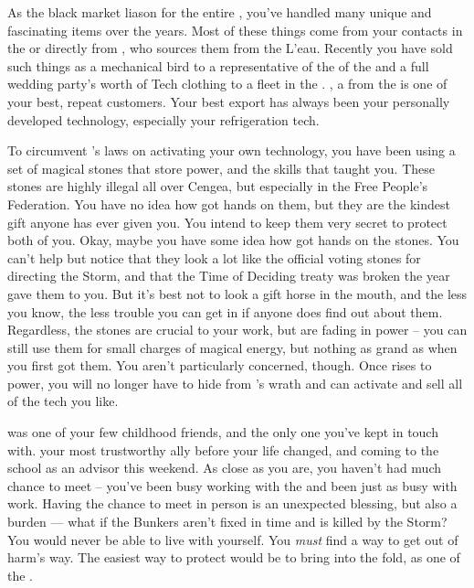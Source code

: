 \documentclass[char]{GL2020}
\begin{document}
As the black market liason for the entire \pTech{}, you've handled many unique and fascinating items over the years. Most of these things come from your contacts in the \pTech{} or directly from \cChupSecond{}, who sources them from the L'eau. Recently you have sold such things as a mechanical bird to a representative of the \cQueen{\Majesty} of the \pFarm{} and a full wedding party's worth of Tech clothing to a fleet in the \pShip{}. \cHedonist{\full}, a \cHedonist{\cleric} from the \pFarm{} is one of your best, repeat customers. Your best export has always been your personally developed technology, especially your refrigeration tech. 

To circumvent \cTechGod{}'s laws on activating your own technology, you have been using a set of magical stones that store power, and the skills that \cGenesis{} taught you. These stones are highly illegal all over Cengea, but especially in the Free People's Federation. You have no idea how \cHeadScientist{} got \cHeadScientist{\their} hands on them, but they are the kindest gift anyone has ever given you. You intend to keep them very secret to protect both of you. Okay, maybe you have some idea how \cHeadScientist{} got \cHeadScientist{\their} hands on the stones. You can't help but notice that they look a lot like the official voting stones for directing the Storm, and that the Time of Deciding treaty was broken the year \cHeadScientist{} gave them to you. But it's best not to look a gift horse in the mouth, and the less you know, the less trouble you can get in if anyone does find out about them. Regardless, the stones are crucial to your work, but are fading in power – you can still use them for small charges of magical energy, but nothing as grand as when you first got them. You aren't particularly concerned, though. Once \cGenesis{} rises to power, you will no longer have to hide from \cTechGod{}'s wrath and can activate and sell all of the tech you like.

\cHeadScientist{} was one of your few childhood friends, and the only one you've kept in touch with. \cHeadScientist{\They} \cHeadScientist{\were} your most trustworthy ally before your life changed, and \cHeadScientist{\theyare} coming to the school as an advisor this weekend. As close as you are, you haven't had much chance to meet -- you've been busy working with the \pGoaties{} and \cHeadScientist{\they} \cHeadScientist{\have} been just as busy with \cHeadScientist{\their} work. Having the chance to meet in person is an unexpected blessing, but also a burden — what if the Bunkers aren't fixed in time and \cHeadScientist{} is killed by the Storm? You would never be able to live with yourself. You \emph{must} find a way to get \cHeadScientist{} out of harm's way. The easiest way to protect \cHeadScientist{\them} would be to bring \cHeadScientist{\them} into the fold, as one of the \pGoaties{}.
\end{document}
